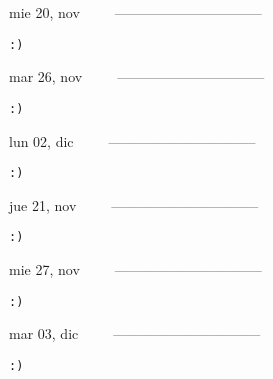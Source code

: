 \documentclass[letterpaper,10pt]{article}
\begin{document}
\begin{multicols}{3}
{mie 20, nov\ \ \ \ \ --------------------------------}
\begin{flushright}\begin{small}\texttt{:)}\end{small}\end{flushright}
\vfill
{mar 26, nov\ \ \ \ \ --------------------------------}
\begin{flushright}\begin{small}\texttt{:)}\end{small}\end{flushright}\par
\vfill
{lun 02, dic\ \ \ \ \ --------------------------------}
\begin{flushright}\begin{small}\texttt{:)}\end{small}\end{flushright}\par
\vfill
\end{multicols}
\vspace{1.05cm}

\begin{multicols}{3}
{jue 21, nov\ \ \ \ \ --------------------------------}
\begin{flushright}\begin{small}\texttt{:)}\end{small}\end{flushright}
\vfill
{mie 27, nov\ \ \ \ \ --------------------------------}
\begin{flushright}\begin{small}\texttt{:)}\end{small}\end{flushright}\par
\vfill
{mar 03, dic\ \ \ \ \ --------------------------------}
\begin{flushright}\begin{small}\texttt{:)}\end{small}\end{flushright}\par
\vfill
\end{multicols}
\vspace{1.05cm}
\end{document}
